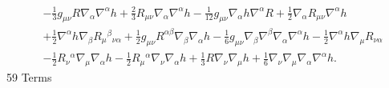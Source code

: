 \documentclass[10pt,letterpaper]{article}
\begin{document}
\begin{align}
\\ \nonumber \\
&- \tfrac{1}{3} g_{\mu \nu} R \nabla_{\alpha}\nabla^{\alpha}h
 + \tfrac{2}{3} R_{\mu \nu} \nabla_{\alpha}\nabla^{\alpha}h
 -  \tfrac{1}{12} g_{\mu \nu} \nabla_{\alpha}h \nabla^{\alpha}R
 + \tfrac{1}{2} \nabla_{\alpha}R_{\mu \nu} \nabla^{\alpha}h\nonumber\\
& + \tfrac{1}{2} \nabla^{\alpha}h \nabla_{\beta}R_{\mu}{}^{\beta}{}_{\nu \alpha}
 + \tfrac{1}{2} g_{\mu \nu} R^{\alpha \beta} \nabla_{\beta}\nabla_{\alpha}h
 -  \tfrac{1}{6} g_{\mu \nu} \nabla_{\beta}\nabla^{\beta}\nabla_{\alpha}\nabla^{\alpha}h
 -  \tfrac{1}{2} \nabla^{\alpha}h \nabla_{\mu}R_{\nu \alpha}\nonumber\\
& -  \tfrac{1}{2} R_{\nu}{}^{\alpha} \nabla_{\mu}\nabla_{\alpha}h
 -  \tfrac{1}{2} R_{\mu}{}^{\alpha} \nabla_{\nu}\nabla_{\alpha}h
 + \tfrac{1}{3} R \nabla_{\nu}\nabla_{\mu}h
 + \tfrac{1}{6} \nabla_{\nu}\nabla_{\mu}\nabla_{\alpha}\nabla^{\alpha}h.
\end{align}
59 Terms
\end{document}
